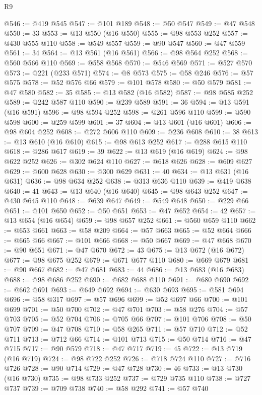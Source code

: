 \begin{lexlean}{R9}
\begin{coremodule}
@546 := @419 @545
@547 := @101 @189
@548 := @50 @547
@549 := @47 @548
@550 := 33
@553 := @13 @550 (@16 @550)
@555 := @98 @553 @252
@557 := @430 @555 @110
@558 := @549 @557
@559 := @90 @547
@560 := @47 @559
@561 := 34
@564 := @13 @561 (@16 @561)
@566 := @98 @564 @252
@568 := @560 @566 @110
@569 := @558 @568
@570 := @546 @569
@571 := @527 @570
@573 := @221 (@233 @571)
@574 := @8 @573
@575 := @58 @246
@576 := @57 @575
@578 := @52 @576 @66
@579 := @101 @578
@580 := @50 @579
@581 := @47 @580
@582 := 35
@585 := @13 @582 (@16 @582)
@587 := @98 @585 @252
@589 := @242 @587 @110
@590 := @239 @589
@591 := 36
@594 := @13 @591 (@16 @591)
@596 := @98 @594 @252
@598 := @261 @596 @110
@599 := @590 @598
@600 := @259 @599
@601 := 37
@604 := @13 @601 (@16 @601)
@606 := @98 @604 @252
@608 := @272 @606 @110
@609 := @236 @608
@610 := 38
@613 := @13 @610 (@16 @610)
@615 := @98 @613 @252
@617 := @288 @615 @110
@618 := @286 @617
@619 := 39
@622 := @13 @619 (@16 @619)
@624 := @98 @622 @252
@626 := @302 @624 @110
@627 := @618 @626
@628 := @609 @627
@629 := @600 @628
@630 := @300 @629
@631 := 40
@634 := @13 @631 (@16 @631)
@636 := @98 @634 @252
@638 := @313 @636 @110
@639 := @419 @638
@640 := 41
@643 := @13 @640 (@16 @640)
@645 := @98 @643 @252
@647 := @430 @645 @110
@648 := @639 @647
@649 := @549 @648
@650 := @229 @66
@651 := @101 @650
@652 := @50 @651
@653 := @47 @652
@654 := 42
@657 := @13 @654 (@16 @654)
@659 := @98 @657 @252
@661 := @560 @659 @110
@662 := @653 @661
@663 := @58 @209
@664 := @57 @663
@665 := @52 @664
@666 := @665 @66
@667 := @101 @666
@668 := @50 @667
@669 := @47 @668
@670 := @90 @651
@671 := @47 @670
@672 := 43
@675 := @13 @672 (@16 @672)
@677 := @98 @675 @252
@679 := @671 @677 @110
@680 := @669 @679
@681 := @90 @667
@682 := @47 @681
@683 := 44
@686 := @13 @683 (@16 @683)
@688 := @98 @686 @252
@690 := @682 @688 @110
@691 := @680 @690
@692 := @662 @691
@693 := @649 @692
@694 := @630 @693
@695 := @581 @694
@696 := @58 @317
@697 := @57 @696
@699 := @52 @697 @66
@700 := @101 @699
@701 := @50 @700
@702 := @47 @701
@703 := @58 @276
@704 := @57 @703
@705 := @52 @704
@706 := @705 @66
@707 := @101 @706
@708 := @50 @707
@709 := @47 @708
@710 := @58 @265
@711 := @57 @710
@712 := @52 @711
@713 := @712 @66
@714 := @101 @713
@715 := @50 @714
@716 := @47 @715
@717 := @90 @579
@718 := @47 @717
@719 := 45
@722 := @13 @719 (@16 @719)
@724 := @98 @722 @252
@726 := @718 @724 @110
@727 := @716 @726
@728 := @90 @714
@729 := @47 @728
@730 := 46
@733 := @13 @730 (@16 @730)
@735 := @98 @733 @252
@737 := @729 @735 @110
@738 := @727 @737
@739 := @709 @738
@740 := @58 @292
@741 := @57 @740

\end{coremodule}
\end{lexlean}
